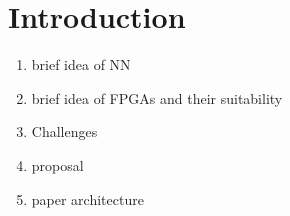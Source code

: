 \section{Introduction}
\label{sec_intro}

\begin{enumerate}
\item brief idea of NN
\item brief idea of FPGAs and their suitability
\item Challenges
\item proposal
\item paper architecture
\end{enumerate}